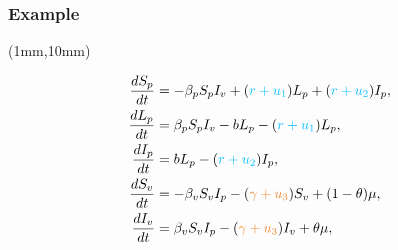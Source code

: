 \begin{frame}[plain]
\frametitle{Example}
    {
        \begin{textblock*}{70mm}(1mm,10mm)
            \begin{greenbox}{}
                \begin{align*}
                    \frac{dS_p}{dt} &=
                    -\beta_p S_p I_v +(\textcolor{capri}{r 
                    +u_1})L_p + 
                    (\textcolor{capri}{r + u_2}) I_p,
                    \\
                    \frac{dL_p}{dt} &=
                    \beta_p S_p I_v -b L_p 
                    -(\textcolor{capri}{r + u_1})L_p,
                    \\
                    \frac{dI_p}{dt} &= 
                    b L_p - (\textcolor{capri}{r + u_2}) I_p,
                    \\
                    \frac{dS_v}{dt} &=
                    -\beta_v S_v I_p 
                    - (\textcolor{cadmiumorange}{\gamma+u_3}) 
                    S_v 
                        +(1-\theta)\mu,
                    \\
                    \frac{dI_v}{dt} &=
                    \beta_v S_v I_p 
                    -(\textcolor{cadmiumorange}{\gamma+u_3}) 
                    I_v 
                    +\theta\mu,
                \end{align*}
            \end{greenbox}
        \end{textblock*}
    }
\end{frame}
